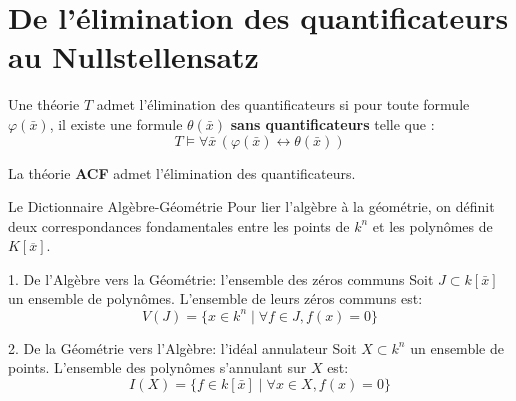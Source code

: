 \documentclass{beamer}
\begin{document}
  
  \section{De l'élimination des quantificateurs au Nullstellensatz}

    

  \begin{frame}
\begin{definition}
        Une théorie $T$ admet l'élimination des quantificateurs si pour toute formule $\varphi(\bar{x})$, il existe une formule $\theta(\bar{x})$ \textbf{sans quantificateurs} telle que :
        \[ T \models \forall \bar{x} \, (\varphi(\bar{x}) \leftrightarrow \theta(\bar{x})) \]
    \end{definition}


  \pause 
  \begin{theorem}[Tarski, 1951]
        La théorie \textbf{ACF} admet l'élimination des quantificateurs.
    \end{theorem}
  \end{frame}
  

  \begin{frame}{Le Dictionnaire Algèbre-Géométrie}
    Pour lier l'algèbre à la géométrie, on définit deux correspondances fondamentales entre les points de $k^n$ et les polynômes de $K[\overline{x}]$.

    \pause
    \begin{block}{1. De l'Algèbre vers la Géométrie: l'ensemble des zéros communs}
        Soit $J \subset k[\bar{x}]$ un ensemble de polynômes. L'ensemble de leurs zéros communs est:
        \[ V(J) = \{ x \in k^n \mid \forall f \in J, f(x) = 0 \} \]
        
    \end{block}
    \pause
    \begin{block}{2. De la Géométrie vers l'Algèbre: l'idéal annulateur}
        Soit $X \subset k^n$ un ensemble de points. L'ensemble des polynômes s'annulant sur $X$ est:
        \[ I(X) = \{ f \in k[\bar{x}] \mid \forall x \in X, f(x) = 0 \} \]
    \end{block}
\end{frame}
\end{document}
